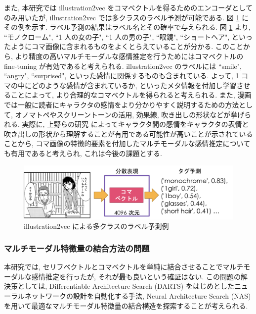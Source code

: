 また, 本研究では illustration2vec をコマベクトルを得るためのエンコーダとしてのみ用いたが, illustration2vec では多クラスのラベル予測が可能である. 図 \ref{fig:i2v_tag} にその例を示す. ラベル予測の結果はラベル名とその確率で与えられる. 図 \ref{fig:i2v_tag} より, ``モノクローム", ``1 人の女の子", ``1 人の男の子", ``眼鏡", ``ショートヘア", といったようにコマ画像に含まれるものをよくとらえていることが分かる. このことから, より精度の高いマルチモーダルな感情推定を行うためにはコマベクトルの fine-tuning が有効であると考えられる. illustration2vec のラベルには ``smile", ``angry", ``surprised", といった感情に関係するものも含まれている. よって, 1 コマの中にどのような感情が含まれているか, といったメタ情報を付加し学習させることによって, より合理的なコマベクトルを得られると考えられる. また, 漫画では一般に読者にキャラクタの感情をより分かりやすく説明するための方法として, オノマトペやスクリーントーンの活用, 効果線, 吹き出しの形状などが挙げられる. 実際に, 上野らの研究 \cite{ueno-emotion2016} によってキャラクタ間の感情をキャラクタの表情と吹き出しの形状から理解することが有用である可能性が高いことが示されていることから, コマ画像の特徴的要素を付加したマルチモーダルな感情推定についても有用であると考えられ, これは今後の課題とする.

\begin{figure}[!h]
  \vspace{10mm}
  \centering
  \includegraphics[width=0.9\hsize]{doc/figures/illustration2vec_tag.png}
  \caption{illustration2vec による多クラスのラベル予測例}
  \label{fig:i2v_tag}
\end{figure}

\newpage

\changeindent{0cm}
\subsubsection{マルチモーダル特徴量の結合方法の問題}
\changeindent{2cm}

本研究では, セリフベクトルとコマベクトルを単純に結合させることでマルチモーダルな感情推定を行ったが, それが最も良いという確証はない. この問題の解決策としては, Differentiable Architecture Search (DARTS) \cite{DBLP:journals/corr/abs-1806-09055} をはじめとしたニューラルネットワークの設計を自動化する手法, Neural Architecture Search (NAS) を用いて最適なマルチモーダル特徴量の結合構造を探索することが考えられる.

